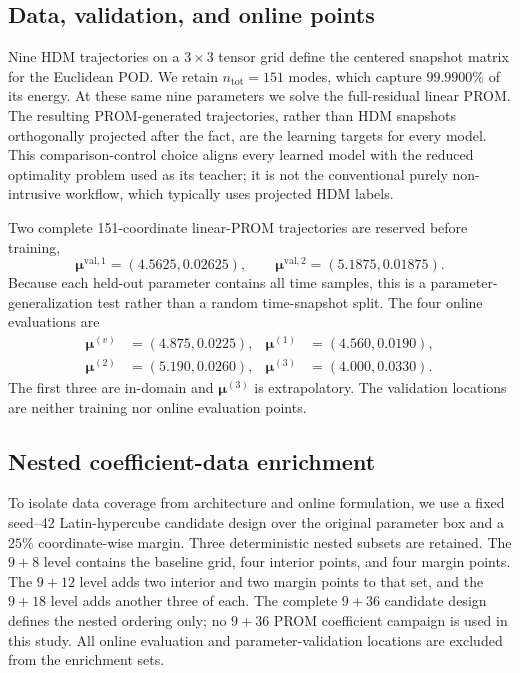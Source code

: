 \documentclass[11pt]{article}
\newcommand{\mub}{\bm\mu}
\begin{document}
\subsection{Data, validation, and online points}
Nine HDM trajectories on a $3\times3$ tensor grid define the centered
snapshot matrix for the Euclidean POD.  We retain $n_{\mathrm{tot}}=151$
modes, which capture $99.9900\%$ of its energy.  At these same nine parameters
we solve the full-residual linear PROM.  The resulting PROM-generated
trajectories, rather than HDM snapshots orthogonally projected after the fact,
are the learning targets for every model.  This comparison-control choice
aligns every learned model with the reduced optimality problem used as its
teacher; it is not the conventional purely non-intrusive workflow, which
typically uses projected HDM labels.

Two complete 151-coordinate linear-PROM trajectories are reserved before
training,
\begin{equation}
\mub^{\mathrm{val},1}=(4.5625,0.02625),\qquad
\mub^{\mathrm{val},2}=(5.1875,0.01875).
\label{eq:validation-points}
\end{equation}
Because each held-out parameter contains all time samples, this is a
parameter-generalization test rather than a random time-snapshot split.  The
four online evaluations are
\begin{equation}
\begin{aligned}
\mub^{(v)}&=(4.875,0.0225),&
\mub^{(1)}&=(4.560,0.0190),\\
\mub^{(2)}&=(5.190,0.0260),&
\mub^{(3)}&=(4.000,0.0330).
\end{aligned}
\label{eq:evaluation-points}
\end{equation}
The first three are in-domain and $\mub^{(3)}$ is extrapolatory.  The
validation locations are neither training nor online evaluation points.

\subsection{Nested coefficient-data enrichment}
To isolate data coverage from architecture and online formulation, we use a
fixed seed--42 Latin-hypercube candidate design over the original parameter
box and a $25\%$ coordinate-wise margin.  Three deterministic nested subsets
are retained.  The $9+8$ level contains the baseline grid, four interior
points, and four margin points.  The $9+12$ level adds two interior and two
margin points to that set, and the $9+18$ level adds another three of each.
The complete
$9+36$ candidate design defines the nested ordering only; no $9+36$ PROM
coefficient campaign is used in this study.  All online evaluation and
parameter-validation locations are excluded from the enrichment sets.
\end{document}
